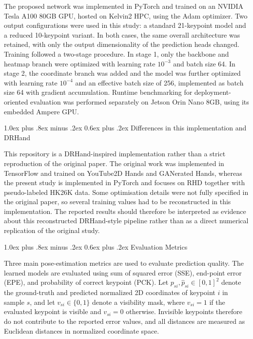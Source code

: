 ﻿\documentclass[10pt,letterpaper]{article}
\makeatletter
\renewcommand\subsection{\@startsection{subsection}{2}{\z@}%
  {1.0ex plus .8ex minus .2ex}%
  {0.6ex plus .2ex}%
  {\normalfont\itshape}}
\makeatother
\begin{document}
The proposed network was implemented in PyTorch and trained on an NVIDIA Tesla A100 80GB GPU, hosted on Kelvin2 HPC, using the Adam optimizer. Two output configurations were used in this study: a standard 21-keypoint model and a reduced 10-keypoint variant. In both cases, the same overall architecture was retained, with only the output dimensionality of the prediction heads changed. Training followed a two-stage procedure. In stage 1, only the backbone and heatmap branch were optimized with learning rate \(10^{-3}\) and batch size 64. In stage 2, the coordinate branch was added and the model was further optimized with learning rate \(10^{-4}\) and an effective batch size of 256, implemented as batch size 64 with gradient accumulation. Runtime benchmarking for deployment-oriented evaluation was performed separately on Jetson Orin Nano 8GB, using its embedded Ampere GPU.

\subsection{Differences in this implementation and DRHand}

\noindent This repository is a DRHand-inspired implementation rather than a strict reproduction of the original paper. The original work was implemented in TensorFlow and trained on YouTube2D Hands and GANerated Hands, whereas the present study is implemented in PyTorch and focuses on RHD together with pseudo-labeled HK26K data. Some optimisation details were not fully specified in the original paper, so several training values had to be reconstructed in this implementation. The reported results should therefore be interpreted as evidence about this reconstructed DRHand-style pipeline rather than as a direct numerical replication of the original study.


\subsection{Evaluation Metrics}

\noindent
Three main pose-estimation metrics are used to evaluate prediction quality. The learned models are evaluated using sum of squared error (SSE), end-point error (EPE), and probability of correct keypoint (PCK). Let \(p_{si}, \hat{p}_{si} \in [0,1]^2\) denote the ground-truth and predicted normalized 2D coordinates of keypoint \(i\) in sample \(s\), and let \(v_{si} \in \{0,1\}\) denote a visibility mask, where \(v_{si}=1\) if the evaluated keypoint is visible and \(v_{si}=0\) otherwise. Invisible keypoints therefore do not contribute to the reported error values, and all distances are measured as Euclidean distances in normalized coordinate space.
\end{document}
